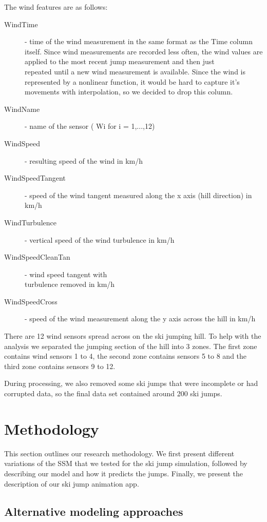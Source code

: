 \documentclass[sigconf,natbib=false, language=english]{acmart}
\begin{document}
The wind features are as follows:
\begin{description}
    \item [WindTime] - time of the wind measurement in the same format as the Time column itself. Since wind measurements
    are recorded less often, the wind values are applied to the most recent jump measurement and then just \\
    repeated until a new wind measurement is available. Since the wind is represented by a nonlinear function, it would be hard to capture
    it's movements with interpolation, so we decided to drop this column.
    \item [WindName] - name of the sensor ( Wi for i = 1,...,12)
    \item [WindSpeed] - resulting speed of the wind in km/h 
    \item [WindSpeedTangent] - speed of the wind tangent measured along the x axis (hill direction) in km/h
    \item [WindTurbulence] - vertical speed of the wind turbulence in km/h
    \item [WindSpeedCleanTan] - wind speed tangent with\\
     turbulence removed in km/h
    \item [WindSpeedCross] - speed of the wind measurement along the y axis across the hill in km/h
\end{description}

There are 12 wind sensors spread across on the ski jumping hill. To help with
the analysis we separated the jumping section of the hill into 3 zones. The first zone
contains wind sensors 1 to 4, the second zone contains sensors 5 to 8 and the third zone
contains sensors 9 to 12.

During processing, we also removed some ski jumps that were incomplete or had corrupted data, so the
final data set contained around 200 ski jumps.

\section{Methodology}\label{sec:method}
This section outlines our research methodology. We first present different variations 
of the SSM that we tested for the ski jump simulation, followed by describing our model 
and how it predicts the jumps. Finally, we present the description of our ski jump 
animation app.

\subsection{Alternative modeling approaches}
\end{document}
